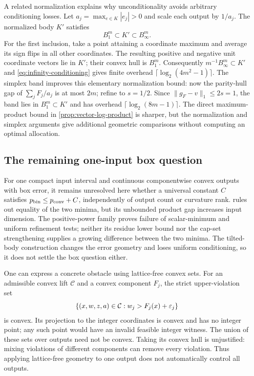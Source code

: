 A related normalization explains why unconditionality avoids arbitrary
conditioning losses. Let $a_j=\max_{e\in K}|e_j|>0$ and scale each
output by $1/a_j$. The normalized body $K'$ satisfies
\[
 B_1^m\subset K'\subset B_\infty^m.
\]
For the first inclusion, take a point attaining a coordinate maximum and
average its sign flips in all other coordinates. The resulting positive
and negative unit coordinate vectors lie in $K'$; their convex hull
is $B_1^m$. Consequently $m^{-1}B_\infty^m\subset K'$ and
\eqref{eq:infinity-conditioning} gives finite overhead
$\lceil\log_2(4m^2-1)\rceil$. The simplex band improves this elementary
normalization bound: now the parity-hull gap of $\sum_jF_j/a_j$ is at
most $2m$; refine to $s=1/2$. Since
$\|g_F-v\|_1\le2s=1$, the band lies in $B_1^m\subset K'$ and
has overhead $\lceil\log_2(8m-1)\rceil$.
The direct maximum-product bound in \cref{prop:vector-log-product}
is sharper, but the normalization and simplex arguments give additional
geometric comparisons without computing an optimal allocation.

\subsection{The remaining one-input box question}\label{subsec:one-input-open}

For one compact input interval and continuous componentwise convex outputs
with box error, it remains unresolved here whether a universal constant
$C$ satisfies $p_{\mathrm{bin}}\le p_{\mathrm{conv}}+C$, independently of output count or
curvature rank.  rules out equality of the two
minima, but its unbounded product gap increases input dimension.
The positive-power family proves failure of scalar-minimum and uniform
refinement tests; neither its residue lower bound nor the cap-set
strengthening supplies a growing difference between the two minima.
The tilted-body construction changes the error geometry and loses
uniform conditioning, so it does not settle the box question either.

One can express a concrete obstacle using lattice-free convex sets.
For an admissible convex lift $\mathcal C$ and a convex component $F_j$,
the strict upper-violation set
\[
 \{(x,w,z,a)\in\mathcal C:w_j>F_j(x)+\varepsilon_j\}
\]
is convex. Its projection to the integer coordinates is convex and has
no integer point; any such point would have an invalid feasible integer
witness. The union of these sets over outputs need not be convex.
Taking its convex hull is unjustified: mixing violations of different
components can remove every violation. Thus applying lattice-free
geometry to one output does not automatically control all outputs.

